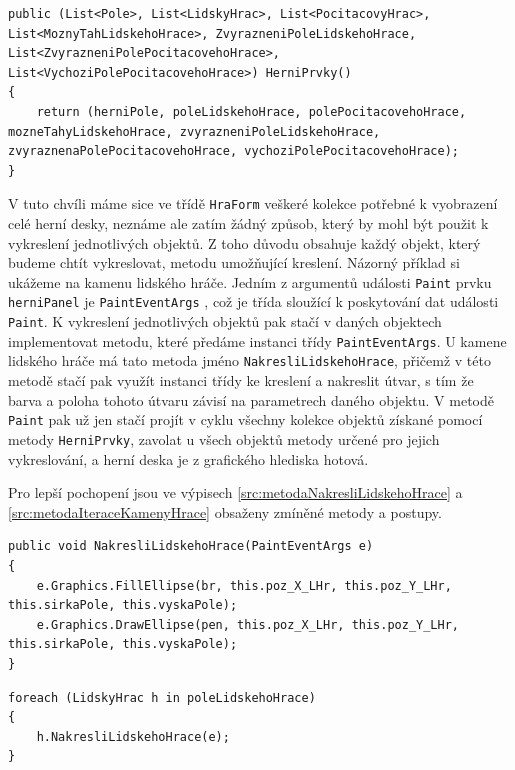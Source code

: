 \begin{lstlisting}[label=src:metodaHerniPrvky,caption={Metoda vracející kolekce všech vyobrazovaných objektů}]
public (List<Pole>, List<LidskyHrac>, List<PocitacovyHrac>, List<MoznyTahLidskehoHrace>, ZvyrazneniPoleLidskehoHrace, List<ZvyrazneniPolePocitacovehoHrace>, List<VychoziPolePocitacovehoHrace>) HerniPrvky()
{
    return (herniPole, poleLidskehoHrace, polePocitacovehoHrace, mozneTahyLidskehoHrace, zvyrazneniPoleLidskehoHrace, zvyraznenaPolePocitacovehoHrace, vychoziPolePocitacovehoHrace);
}
\end{lstlisting}

V tuto chvíli máme sice ve třídě \lstinline$HraForm$ veškeré kolekce potřebné k vyobrazení celé herní desky, neznáme ale zatím žádný způsob, který by mohl být použit k vykreslení jednotlivých objektů. Z toho důvodu obsahuje každý objekt, který budeme chtít vykreslovat, metodu umožňující kreslení. Názorný příklad si ukážeme na kamenu lidského hráče. Jedním z argumentů události \lstinline$Paint$ prvku \lstinline$herniPanel$ je \lstinline$PaintEventArgs$ \cite{painteventargs}, což je třída sloužící k poskytování dat události \lstinline$Paint$. K vykreslení jednotlivých objektů pak stačí v daných objektech implementovat metodu, které předáme instanci třídy \lstinline$PaintEventArgs$. U kamene lidského hráče má tato metoda jméno \lstinline$NakresliLidskehoHrace$, přičemž v této metodě stačí pak využít instanci třídy ke kreslení a nakreslit útvar, s tím že barva a poloha tohoto útvaru závisí na parametrech daného objektu. V metodě \lstinline$Paint$ pak už jen stačí projít v cyklu všechny kolekce objektů získané pomocí metody \lstinline$HerniPrvky$, zavolat u všech objektů metody určené pro jejich vykreslování, a herní deska je z grafického hlediska hotová.

Pro lepší pochopení jsou ve výpisech \ref{src:metodaNakresliLidskehoHrace} a \ref{src:metodaIteraceKamenyHrace} obsaženy zmíněné metody a postupy.

\begin{lstlisting}[label=src:metodaNakresliLidskehoHrace,caption={Metoda vykreslující kámen lidského hráče}]
public void NakresliLidskehoHrace(PaintEventArgs e)
{
    e.Graphics.FillEllipse(br, this.poz_X_LHr, this.poz_Y_LHr, this.sirkaPole, this.vyskaPole);
    e.Graphics.DrawEllipse(pen, this.poz_X_LHr, this.poz_Y_LHr, this.sirkaPole, this.vyskaPole);
}
\end{lstlisting}

\newpage

\begin{lstlisting}[label=src:metodaIteraceKamenyHrace,caption={Metoda vykreslující postupně všechny kameny lidského hráče}]
foreach (LidskyHrac h in poleLidskehoHrace)
{
    h.NakresliLidskehoHrace(e);
}
\end{lstlisting}

